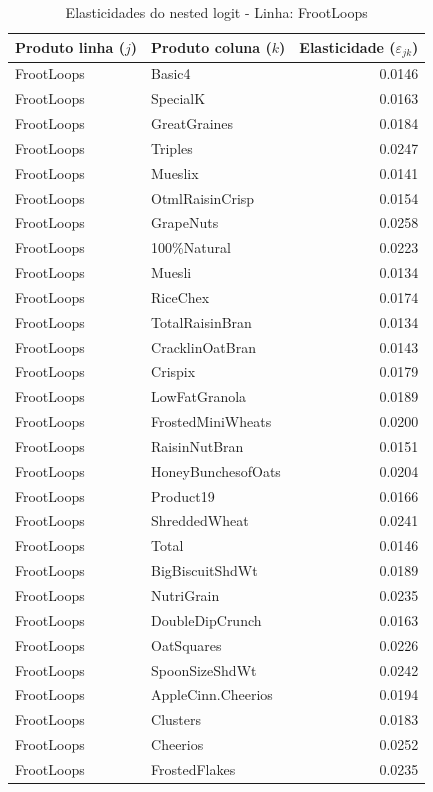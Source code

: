 \begingroup
\begin{table}[H]
\centering
\caption{Elasticidades do nested logit - Linha: FrootLoops}
\label{tab:elas-nested-frootloops}
\small
\begin{tabular}{llr}
\toprule
Produto linha ($j$) & Produto coluna ($k$) & Elasticidade ($\varepsilon_{jk}$) \\
\midrule
FrootLoops & Basic4 & 0.0146 \\
FrootLoops & SpecialK & 0.0163 \\
FrootLoops & GreatGraines & 0.0184 \\
FrootLoops & Triples & 0.0247 \\
FrootLoops & Mueslix & 0.0141 \\
FrootLoops & OtmlRaisinCrisp & 0.0154 \\
FrootLoops & GrapeNuts & 0.0258 \\
FrootLoops & 100\%Natural & 0.0223 \\
FrootLoops & Muesli & 0.0134 \\
FrootLoops & RiceChex & 0.0174 \\
FrootLoops & TotalRaisinBran & 0.0134 \\
FrootLoops & CracklinOatBran & 0.0143 \\
FrootLoops & Crispix & 0.0179 \\
FrootLoops & LowFatGranola & 0.0189 \\
FrootLoops & FrostedMiniWheats & 0.0200 \\
FrootLoops & RaisinNutBran & 0.0151 \\
FrootLoops & HoneyBunchesofOats & 0.0204 \\
FrootLoops & Product19 & 0.0166 \\
FrootLoops & ShreddedWheat & 0.0241 \\
FrootLoops & Total & 0.0146 \\
FrootLoops & BigBiscuitShdWt & 0.0189 \\
FrootLoops & NutriGrain & 0.0235 \\
FrootLoops & DoubleDipCrunch & 0.0163 \\
FrootLoops & OatSquares & 0.0226 \\
FrootLoops & SpoonSizeShdWt & 0.0242 \\
FrootLoops & AppleCinn.Cheerios & 0.0194 \\
FrootLoops & Clusters & 0.0183 \\
FrootLoops & Cheerios & 0.0252 \\
FrootLoops & FrostedFlakes & 0.0235 \\

\end{tabular}
\end{table}
